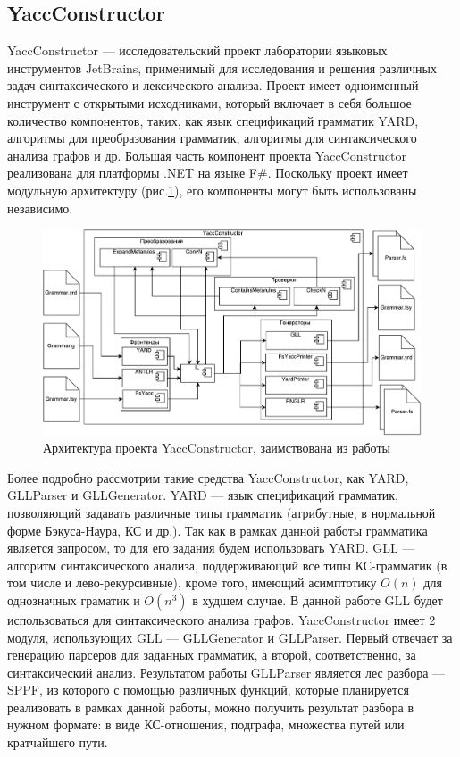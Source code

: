 \documentclass[14pt]{matmex-diploma-custom}
\begin{document}
	\subsection{YaccConstructor}
	    YaccConstructor --- исследовательский проект лаборатории языковых инструментов JetBrains, применимый для исследования и решения различных задач синтаксического и лексического анализа. Проект имеет одноименный инструмент с открытыми исходниками, который включает в себя большое количество компонентов, таких, как язык спецификаций грамматик YARD, алгоритмы для преобразования грамматик, алгоритмы для синтаксического анализа графов и др. Большая часть компонент проекта YaccConstructor реализована для платформы .NET на языке F\#. Поскольку проект имеет модульную архитектуру (рис.\ref{arch}), его компоненты могут быть использованы независимо.
	    
        \begin{figure}
            \centering
            \includegraphics[width=\textwidth]{pics/YCArch.pdf}
            \caption{Архитектура проекта YaccConstructor, заимствована из работы \cite{gsv_phd} \label{arch}}
        \end{figure}
	    
	    Более подробно рассмотрим такие средства YaccConstructor, как YARD, GLLParser и GLLGenerator. YARD --- язык спецификаций грамматик, позволяющий задавать различные типы грамматик (атрибутные, в нормальной форме Бэкуса-Наура, КС и др.). Так как в рамках данной работы грамматика является запросом, то для его задания будем использовать YARD. GLL --- алгоритм синтаксического анализа, поддерживающий все типы КС-грамматик (в том числе и лево-рекурсивные), кроме того, имеющий асимптотику \(O(n)\) для однозначных граматик и \(O(n^3)\) в худшем случае. В данной работе GLL будет использоваться для синтаксического анализа графов. YaccConstructor имеет 2 модуля, использующих GLL --- GLLGenerator и GLLParser. Первый отвечает за генерацию парсеров для заданных грамматик, а второй, соответственно, за синтаксический анализ. Результатом работы GLLParser является лес разбора --- SPPF, из которого с помощью различных функций, которые планируется реализовать в рамках данной работы, можно получить результат разбора в нужном формате: в виде КС-отношения, подграфа, множества путей или кратчайшего пути.
\end{document}
